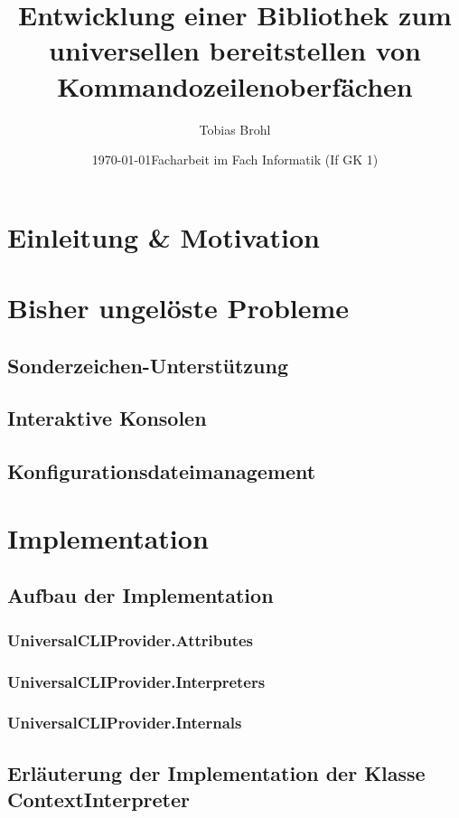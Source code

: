 \documentclass[a4paper,12pt,titlepage,ngerman]{article}
\title{Entwicklung einer Bibliothek zum universellen bereitstellen von Kommandozeilenoberfächen}
\author{Tobias Brohl}
\date{\today \linebreak \linebreak Facharbeit im Fach Informatik (If GK 1)}
\begin{document}
 \begin{sloppypar}
  \maketitle
  \setcounter{tocdepth}{5}
  \thispagestyle{empty}
  \tableofcontents
  \pagebreak
  \section{Einleitung \& Motivation}\label{sec:Intro}
  

  \section{Bisher ungelöste Probleme}\label{sec:CurrentProblems}
  \subsection{Sonderzeichen-Unterstützung}
  \subsection{Interaktive Konsolen}
  \subsection{Konfigurationsdateimanagement}
  \section{Implementation}\label{sec:Content}
  \subsection{Aufbau der Implementation}\label{subsec:Architecture}
  \subsubsection{UniversalCLIProvider.Attributes}
  \subsubsection{UniversalCLIProvider.Interpreters}
  \subsubsection{UniversalCLIProvider.Internals}
  \subsection{Erläuterung der Implementation der Klasse ContextInterpreter}\label{subsec:ConextInterpreter}

\end{sloppypar}
\end{document}
